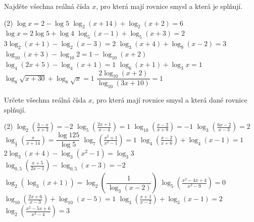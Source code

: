 \begin{exercise}
    Najděte všechna reálná čísla $x$, pro která mají rovnice smysl a která je splňují.
    \begin{tasks}(2)
        \task $\log x = 2 - \log 5$
        \task $\log_{2}(x+14) + \log_{2}(x+2) = 6$
        \task $\log x = 2\log 5 + \log 4$
        \task $\log_{5}(x-1) + \log_{5}(x+3) = 2$
        \task $3\log_{2}(x+1) - \log_{2}(x-3) = 2$
        \task $\log_{3}(x+4) + \log_{9}(x-2) = 3$  
        \task $\log_{10}(x+3) - \log_{10} 2 = 1 - \log_{10}(x+2)$
        \task $\log_{4}(2x+5) - \log_{4}(x+1) = 1$
        \task $\log_{6}(x+1) + \log_{3} x = 1$
        \task $\log_{8}\sqrt{x+30} + \log_{8}\sqrt{x} = 1$
        \task {}
        \task $\dfrac{2\log_{10}(x+2)}{\log_{10}(3x+10)} = 1$
        \task {}
    \end{tasks}
\end{exercise}


\begin{exercise}
    Určete všechna reálná čísla $x$, pro která mají rovnice smysl a která dané rovnice splňují.

    \begin{tasks}(2)
        \task $\log_{2}\!\left(\frac{3 - x}{x + 3}\right) = -2$
        \task $\log_{5}\!\left(\frac{2x + 1}{x - 4}\right) = 1$
        \task $\log_{10}\!\left(\frac{x - 2}{x + 8}\right) = -1$
        \task $\log_{3}\!\left(\frac{6x - 2}{x - 3}\right) = 2$
        \task $\log_{\frac12}\!\left(\frac{x}{x + 14}\right) = \dfrac{\log 125}{\log 5}$
        \task $\log_{7}\!\left(\frac{x^{2} + 1}{x^{2} - 1}\right) = 1$
        \task $\log_{4}\!\left(\frac{x-2}{x+6}\right) + \log_{4}(x-1) = 1$
        \task $2\log_{3}(x+4) - \log_{3}(x^{2}-1) = \log_{3} 3$
        \task $\log_{0{,}5}\!\left(\frac{x+5}{2x-1}\right) - \log_{0{,}5}(x-3) = -2$
        \task $\log_{2}\!\left(\log_{3}(x+1)\right) = \log_{2}\!\left(\dfrac{1}{\,\log_{3}(x-2)}\right)$
        \task $\log_{5}\!\left(\frac{x^{2} - 4x + 4}{x^{2} - 9}\right) = 0$
        \task $ \log_{10}\!\left(\frac{2x + 6}{x - 3}\right) + \log_{10}(x - 5) = 1$
        \task $\log_{3}\!\left(\frac{x + 1}{x - 2}\right) + \log_{3}(x - 1) = 2$
        \task $\log_{2}\!\left(\frac{x^{2} - 5x + 6}{x^{2} - 4}\right) = 3$
    \end{tasks}
\end{exercise}


